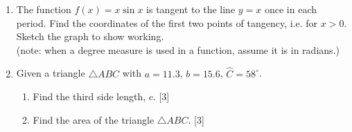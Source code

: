 \documentclass[12pt, twoside]{article}
\begin{document}
\begin{enumerate}
  \newpage
    \item The function $f(x)=x\sin x$ is tangent to the line $y=x$ once in each period. Find the coordinates of the first two points of tangency, i.e. for $x >0$.\\[0.25cm] 
    Sketch the graph to show working. \\(note: when a degree measure is used in a function, assume it is in radians.)


\item Given a triangle $\triangle ABC$ with $a=11.3$, $b=15.6$, $\hat{C} = 58^\circ$. 
    \begin{enumerate}
        \item Find the third side length, $c$. \hfill [3]
        \item Find the area of the triangle $\triangle ABC$. \hfill [3]
    \end{enumerate}


\end{enumerate}
\end{document}
